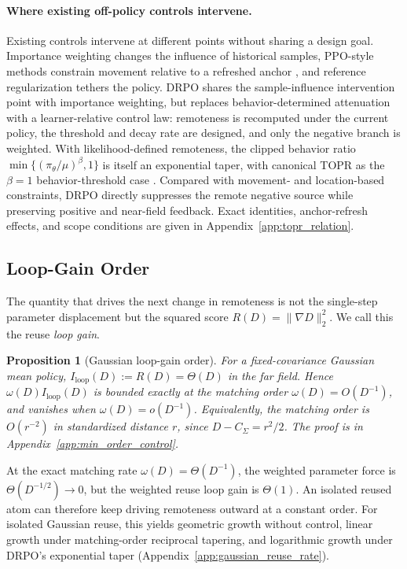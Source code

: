 \documentclass{article}
\theoremstyle{plain}
\newtheorem{proposition}[theorem]{Proposition}
\theoremstyle{definition}
\theoremstyle{remark}
\begin{document}
\paragraph{Where existing off-policy controls intervene.}
Existing controls intervene at different points without sharing a design
goal. Importance weighting changes the influence of historical samples,
PPO-style methods constrain movement relative to a refreshed anchor
\citep{schulman2017proximal}, and reference regularization tethers the
policy. DRPO shares the sample-influence intervention point with importance
weighting, but replaces behavior-determined attenuation with a
learner-relative control law: remoteness is recomputed under the current
policy, the threshold and decay rate are designed, and only the negative
branch is weighted. With likelihood-defined remoteness, the clipped behavior
ratio \(\min\{(\pi_\theta/\mu)^\beta,1\}\) is itself an exponential taper,
with canonical TOPR as the \(\beta=1\) behavior-threshold case
\citep{leroux2025tapered}. Compared with movement- and location-based
constraints, DRPO directly suppresses the remote negative source while
preserving positive and near-field feedback. Exact identities,
anchor-refresh effects, and scope conditions are given in
Appendix~\ref{app:topr_relation}.

\subsection{Loop-Gain Order}
\label{subsec:min_order_control}

The quantity that drives the next change in remoteness is not the
single-step parameter displacement but the squared score
\(R(D)=\|\nabla D\|_2^2\). We call this the reuse \emph{loop gain}.

\begin{proposition}[Gaussian loop-gain order]
\label{prop:loop_gain_order}
For a fixed-covariance Gaussian mean policy,
\(I_{\mathrm{loop}}(D):=R(D)=\Theta(D)\) in the far field. Hence
\(\omega(D)I_{\mathrm{loop}}(D)\) is bounded exactly at the matching
order \(\omega(D)=O(D^{-1})\), and vanishes when
\(\omega(D)=o(D^{-1})\). Equivalently, the matching order is
\(O(r^{-2})\) in standardized distance \(r\), since
\(D-C_\Sigma=r^2/2\). The proof is in
Appendix~\ref{app:min_order_control}.
\end{proposition}

At the exact matching rate \(\omega(D)=\Theta(D^{-1})\), the weighted
parameter force is \(\Theta(D^{-1/2})\to0\), but the weighted reuse loop
gain is \(\Theta(1)\). An isolated reused atom can therefore keep driving
remoteness outward at a constant order. For isolated Gaussian reuse,
this yields geometric growth without control, linear growth under
matching-order reciprocal tapering, and logarithmic growth under
DRPO's exponential taper
(Appendix~\ref{app:gaussian_reuse_rate}).
\end{document}

